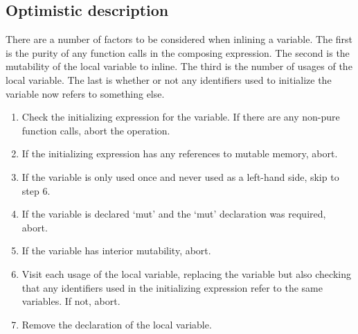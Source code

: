 \subsection{Optimistic description}
There are a number of factors to be considered when inlining a variable. The first is the purity of any function calls in the composing expression. The second is the mutability of the local variable to inline. The third is the number of usages of the local variable. The last is whether or not any identifiers used to initialize the variable now refers to something else.

\begin{enumerate} 
\item Check the initializing expression for the variable. If there are any non-pure function calls, abort the operation.
\item If the initializing expression has any references to mutable memory, abort.
\item If the variable is only used once and never used as a left-hand side, skip to step 6.
\item If the variable is declared `mut' and the `mut' declaration was required, abort.
\item If the variable has interior mutability, abort.
\item Visit each usage of the local variable, replacing the variable but also checking that any identifiers used in the initializing expression refer to the same variables. If not, abort.
\item Remove the declaration of the local variable.
\end{enumerate}

